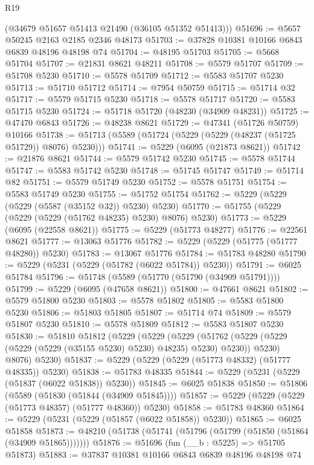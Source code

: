 \begin{lexlean}{R19}
\begin{coremodule}
      (@34679 @51657 @51413 @21490 (@36105 @51352 @51413)))
@51696 := @5657 @50245 @2163 @2185 @2346 @48173
@51703 := @37828 @10381 @10166 @6843 @6839 @48196 @48198 @74
@51704 := @48195 @51703
@51705 := @5668 @51704
@51707 := @21831 @8621 @48211
@51708 := @5579 @51707
@51709 := @51708 @5230
@51710 := @5578 @51709
@51712 := @5583 @51707 @5230
@51713 := @51710 @51712
@51714 := @7954 @50759
@51715 := @51714 @32
@51717 := @5579 @51715 @5230
@51718 := @5578 @51717
@51720 := @5583 @51715 @5230
@51724 := @51718 @51720 (@48230 (@34909 @48231))
@51725 := @47470 @6843
@51726 := @48238 @8621
@51729 := @47341 (@51726 @50759) @10166
@51738 := @51713 (@5589 (@51724 (@5229 (@5229 (@48237 (@51725 @51729)) @8076) @5230)))
@51741 := @5229 (@6095 (@21873 @8621))
@51742 := @21876 @8621
@51744 := @5579 @51742 @5230
@51745 := @5578 @51744
@51747 := @5583 @51742 @5230
@51748 := @51745 @51747
@51749 := @51714 @82
@51751 := @5579 @51749 @5230
@51752 := @5578 @51751
@51754 := @5583 @51749 @5230
@51755 := @51752 @51754
@51762 := @5229 (@5229 (@5229 (@5587 (@35152 @32)) @5230) @5230)
@51770 := @51755 (@5229 (@5229 (@5229 (@51762 @48235) @5230) @8076) @5230)
@51773 := @5229 (@6095 (@22558 @8621))
@51775 := @5229 (@51773 @48277)
@51776 := @22561 @8621
@51777 := @13063 @51776
@51782 := @5229 (@5229 (@51775 (@51777 @48280)) @5230)
@51783 := @13067 @51776
@51784 := @51783 @48280
@51790 := @5229 (@5231 (@5229 (@51782 (@6022 @51784)) @5230))
@51791 := @6025 @51784
@51796 := @51748 (@5589 (@51770 (@51790 (@34909 @51791))))
@51799 := @5229 (@6095 (@47658 @8621))
@51800 := @47661 @8621
@51802 := @5579 @51800 @5230
@51803 := @5578 @51802
@51805 := @5583 @51800 @5230
@51806 := @51803 @51805
@51807 := @51714 @74
@51809 := @5579 @51807 @5230
@51810 := @5578 @51809
@51812 := @5583 @51807 @5230
@51830 := @51810
    @51812
    (@5229
      (@5229
        (@5229
          (@51762 (@5229 (@5229 (@5229 (@5229 (@35155 @5230) @5230) @48235) @5230) @5230))
          @5230)
        @8076)
      @5230)
@51837 := @5229 (@5229 (@5229 (@51773 @48332) (@51777 @48335)) @5230)
@51838 := @51783 @48335
@51844 := @5229 (@5231 (@5229 (@51837 (@6022 @51838)) @5230))
@51845 := @6025 @51838
@51850 := @51806 (@5589 (@51830 (@51844 (@34909 @51845))))
@51857 := @5229 (@5229 (@5229 (@51773 @48357) (@51777 @48360)) @5230)
@51858 := @51783 @48360
@51864 := @5229 (@5231 (@5229 (@51857 (@6022 @51858)) @5230))
@51865 := @6025 @51858
@51873 := @48210 (@51738 (@51741 (@51796 (@51799 (@51850 (@51864 (@34909 @51865)))))))
@51876 := @51696 (fun (__b : @5225) => @51705 @51873)
@51883 := @37837 @10381 @10166 @6843 @6839 @48196 @48198 @74

\end{coremodule}
\end{lexlean}
